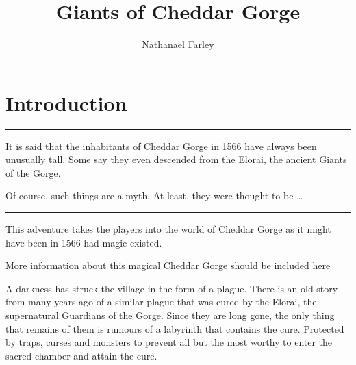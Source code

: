 \documentclass[twocolumn]{memoir}
\title{Giants of Cheddar Gorge}
\author{Nathanael Farley}
\newenvironment{firstperson}{%
\itshape%
\fancybreak{\rule{0.7\linewidth}{1pt}}%
}{%
\fancybreak{\rule{0.7\linewidth}{1pt}}%
}
\begin{document}
\RaggedRight
\maketitle

\section{Introduction}
\begin{firstperson}
It is said that the inhabitants of Cheddar Gorge in 1566 have always been unusually tall. Some say they even descended from the Elorai, the ancient Giants of the Gorge. 

Of course, such things are a myth. At least, they were thought to be \ldots
\end{firstperson}

This adventure takes the players into the world of Cheddar Gorge as it might have been in 1566 had magic existed. 

\begin{commentbox}
More information about this magical Cheddar Gorge should be included here
\end{commentbox}

A darkness has struck the village in the form of a plague. There is an old story from many years ago of a similar plague that was cured by the Elorai, the supernatural Guardians of the Gorge. Since they are long gone, the only thing that remains of them is rumours of a labyrinth that contains the cure. Protected by traps, curses and monsters to prevent all but the most worthy to enter the sacred chamber and attain the cure.
\end{document}
